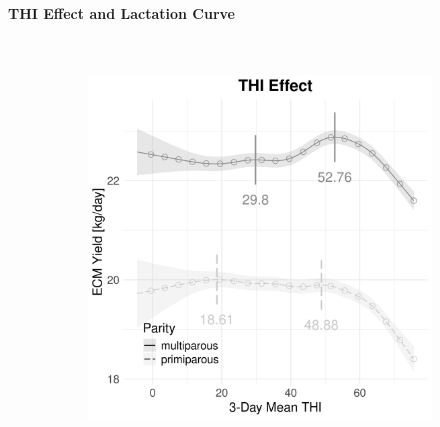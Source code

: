 \newpage
\paragraph{THI Effect and Lactation Curve} \quad \\
\begin{figure}[H]
    \centering
    \begin{subfigure}[b]{0.45\textwidth}
        \centering
        \includegraphics[width=\textwidth]{thesis/figures/models/ecm/full/si_ecm_full/si_ecm_full_marginal_thi_milk_combined.png}
    \end{subfigure}
    \hspace{0.05\textwidth} %
    \begin{subfigure}[b]{0.45\textwidth}
        \centering

\end{subfigure}
\end{figure}
